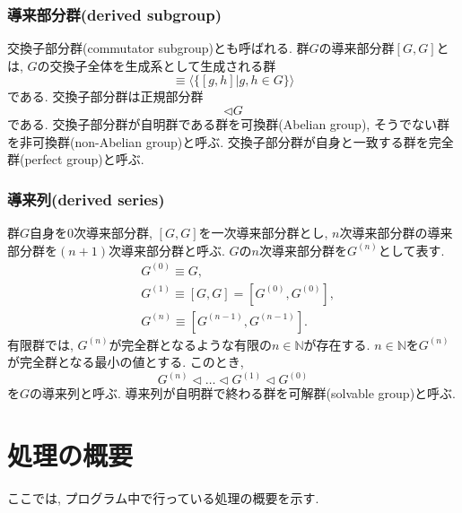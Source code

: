 \documentclass[11pt, a4paper]{jsarticle}
\begin{document}
\subsubsection{導来部分群(derived subgroup)}
交換子部分群(commutator subgroup)とも呼ばれる.
群$G$の導来部分群$[G,G]$とは, $G$の交換子全体を生成系として生成される群
\begin{equation}
	[G, G] \equiv \langle \{ [g,h] | g,h \in G \} \rangle
\end{equation}
である.
交換子部分群は正規部分群
\begin{equation}
	[G, G] \triangleleft G
\end{equation}
である.
交換子部分群が自明群である群を可換群(Abelian group), そうでない群を非可換群(non-Abelian group)と呼ぶ.
交換子部分群が自身と一致する群を完全群(perfect group)と呼ぶ.


\subsubsection{導来列(derived series)}
群$G$自身を0次導来部分群, $[G,G]$を一次導来部分群とし, $n$次導来部分群の導来部分群を$(n+1)$次導来部分群と呼ぶ.
$G$の$n$次導来部分群を$G^{(n)}$として表す.
\begin{equation}
\begin{split}
&G^{(0)} \equiv G, \\
&G^{(1)} \equiv [G,G] = [G^{(0)},G^{(0)}], \\
&G^{(n)} \equiv [G^{(n-1)},G^{(n-1)}].
\end{split}
\end{equation}
有限群では, $G^{(n)}$が完全群となるような有限の$n\in\mathbb{N}$が存在する.
$n\in\mathbb{N}$を$G^{(n)}$が完全群となる最小の値とする.
このとき,
\begin{equation}
G^{(n)} \triangleleft \dots \triangleleft G^{(1)} \triangleleft G^{(0)}
\end{equation}
を$G$の導来列と呼ぶ.
導来列が自明群で終わる群を可解群(solvable group)と呼ぶ.

\newpage
\section{処理の概要}
ここでは, プログラム中で行っている処理の概要を示す.
\end{document}
